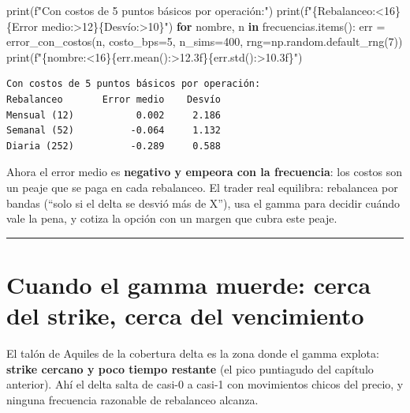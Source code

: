 \documentclass[
  spanish,
  letterpaper,
  DIV=11,
  numbers=noendperiod]{scrreprt}
\newenvironment{Shaded}{\begin{snugshade}}{\end{snugshade}}
\newcommand{\BuiltInTok}[1]{\textcolor[rgb]{0.00,0.23,0.31}{#1}}
\newcommand{\ControlFlowTok}[1]{\textcolor[rgb]{0.00,0.23,0.31}{\textbf{#1}}}
\newcommand{\DecValTok}[1]{\textcolor[rgb]{0.68,0.00,0.00}{#1}}
\newcommand{\KeywordTok}[1]{\textcolor[rgb]{0.00,0.23,0.31}{\textbf{#1}}}
\newcommand{\NormalTok}[1]{\textcolor[rgb]{0.00,0.23,0.31}{#1}}
\newcommand{\OperatorTok}[1]{\textcolor[rgb]{0.37,0.37,0.37}{#1}}
\newcommand{\SpecialCharTok}[1]{\textcolor[rgb]{0.37,0.37,0.37}{#1}}
\newcommand{\SpecialStringTok}[1]{\textcolor[rgb]{0.13,0.47,0.30}{#1}}
\newcommand{\StringTok}[1]{\textcolor[rgb]{0.13,0.47,0.30}{#1}}
\begin{document}
\begin{Shaded}
\begin{Highlighting}[]
\BuiltInTok{print}\NormalTok{(}\SpecialStringTok{f"Con costos de 5 puntos básicos por operación:"}\NormalTok{)}
\BuiltInTok{print}\NormalTok{(}\SpecialStringTok{f"}\SpecialCharTok{\{}\StringTok{\textquotesingle{}Rebalanceo\textquotesingle{}}\SpecialCharTok{:\textless{}16\}\{}\StringTok{\textquotesingle{}Error medio\textquotesingle{}}\SpecialCharTok{:\textgreater{}12\}\{}\StringTok{\textquotesingle{}Desvío\textquotesingle{}}\SpecialCharTok{:\textgreater{}10\}}\SpecialStringTok{"}\NormalTok{)}
\ControlFlowTok{for}\NormalTok{ nombre, n }\KeywordTok{in}\NormalTok{ frecuencias.items():}
\NormalTok{    err }\OperatorTok{=}\NormalTok{ error\_con\_costos(n, costo\_bps}\OperatorTok{=}\DecValTok{5}\NormalTok{, n\_sims}\OperatorTok{=}\DecValTok{400}\NormalTok{, rng}\OperatorTok{=}\NormalTok{np.random.default\_rng(}\DecValTok{7}\NormalTok{))}
    \BuiltInTok{print}\NormalTok{(}\SpecialStringTok{f"}\SpecialCharTok{\{}\NormalTok{nombre}\SpecialCharTok{:\textless{}16\}\{}\NormalTok{err}\SpecialCharTok{.}\NormalTok{mean()}\SpecialCharTok{:\textgreater{}12.3f\}\{}\NormalTok{err}\SpecialCharTok{.}\NormalTok{std()}\SpecialCharTok{:\textgreater{}10.3f\}}\SpecialStringTok{"}\NormalTok{)}
\end{Highlighting}
\end{Shaded}

\begin{verbatim}
Con costos de 5 puntos básicos por operación:
Rebalanceo       Error medio    Desvío
Mensual (12)           0.002     2.186
Semanal (52)          -0.064     1.132
Diaria (252)          -0.289     0.588
\end{verbatim}

Ahora el error medio es \textbf{negativo y empeora con la frecuencia}:
los costos son un peaje que se paga en cada rebalanceo. El trader real
equilibra: rebalancea por bandas (``solo si el delta se desvió más de
X''), usa el gamma para decidir cuándo vale la pena, y cotiza la opción
con un margen que cubra este peaje.

\begin{center}\rule{0.5\linewidth}{0.5pt}\end{center}

\chapter{Cuando el gamma muerde: cerca del strike, cerca del
vencimiento}\label{cuando-el-gamma-muerde-cerca-del-strike-cerca-del-vencimiento}

El talón de Aquiles de la cobertura delta es la zona donde el gamma
explota: \textbf{strike cercano y poco tiempo restante} (el pico
puntiagudo del capítulo anterior). Ahí el delta salta de casi-0 a casi-1
con movimientos chicos del precio, y ninguna frecuencia razonable de
rebalanceo alcanza.
\end{document}

